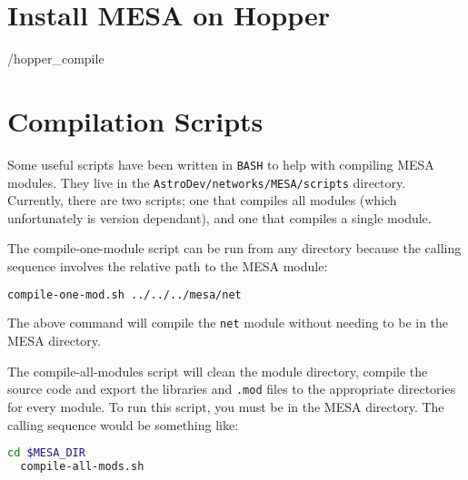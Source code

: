 \section{Install {\sf MESA} on Hopper}
\label{sec:hopper_install}
 \mesafigpath/hopper_compile


\section{Compilation Scripts}
 \label{sec:compile_scripts}

Some useful scripts have been written in {\tt BASH} to help with compiling 
{\sf MESA} modules. They live in the {\tt AstroDev/networks/MESA/scripts} 
directory. Currently, there are two scripts; one that compiles all modules 
(which unfortunately is version dependant), and one that compiles a single 
module.

The compile-one-module script can be run from any directory because the 
calling sequence involves the relative path to the {\sf MESA} module:
\begin{lstlisting}[language=bash,mathescape=false]
  compile-one-mod.sh ../../../mesa/net
\end{lstlisting}
The above command will compile the {\tt net} module without needing to be in 
the {\sf MESA} directory.

The compile-all-modules script will clean the module directory, compile the 
source code and export the libraries and {\tt .mod} files to the appropriate 
directories for every module. To run this script, you must be in the {\sf MESA} 
directory. The calling sequence would be something like:
\begin{lstlisting}[language=bash,mathescape=false]
  cd $MESA_DIR
  compile-all-mods.sh
\end{lstlisting}



